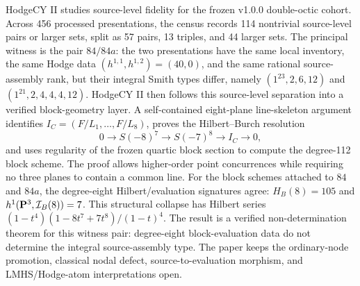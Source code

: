 HodgeCY II studies source-level fidelity for the frozen v1.0.0 double-octic
cohort.  Across 456 processed presentations, the census records 114
nontrivial source-level pairs or larger sets, split as 57 pairs, 13 triples,
and 44 larger sets.  The principal witness is the pair \(84/84a\): the two
presentations have the same local inventory, the same Hodge data
\((h^{1,1},h^{1,2})=(40,0)\), and the same rational source-assembly rank,
but their integral Smith types differ, namely
\((1^{23},2,6,12)\) and \((1^{21},2,4,4,4,12)\).
HodgeCY II then follows this source-level separation into a verified
block-geometry layer.  A self-contained eight-plane line-skeleton argument
identifies \(I_C=(F/L_1,\ldots,F/L_8)\), proves the Hilbert--Burch resolution
\[
0\to S(-8)^7\to S(-7)^8\to I_C\to 0,
\]
and uses regularity of the frozen quartic block section to compute the
degree-112 block scheme.  The proof allows higher-order point concurrences
while requiring no three planes to contain a common line.  For the block
schemes attached to \(84\) and \(84a\),
the degree-eight Hilbert/evaluation signatures agree: \(H_B(8)=105\) and
\(h^1({\bf P}^3,\mathcal I_B(8))=7\).  This structural collapse has Hilbert
series \((1-t^4)(1-8t^7+7t^8)/(1-t)^4\).  The result is a verified
non-determination theorem for this witness pair: degree-eight block-evaluation
data do not determine the integral source-assembly type.  The paper keeps the
ordinary-node promotion, classical nodal defect, source-to-evaluation morphism,
and LMHS/Hodge-atom interpretations open.
